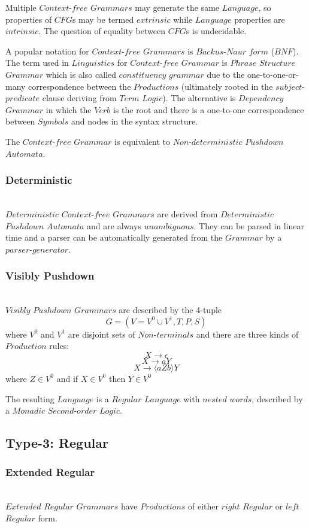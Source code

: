 \documentclass{article}
\begin{document}
Multiple $Context$-$free$ $Grammars$ may generate the same $Language$,
so properties of $CFG$s may be termed $extrinsic$ while $Language$
properties are $intrinsic$. The question of equality between $CFG$s is
undecidable.

A popular notation for $Context$-$free$ $Grammars$ is $Backus$-$Naur$
$form$ ($BNF$). The term used in $Linguistics$ for $Context$-$free$
$Grammar$ is $Phrase$ $Structure$ $Grammar$ which is also called
$constituency$ $grammar$ due to the one-to-one-or-many correspondence
between the $Productions$ (ultimately rooted in the
$subject$-$predicate$ clause deriving from $Term$ $Logic$). The
alternative is $Dependency$ $Grammar$ in which the $Verb$ is the root
and there is a one-to-one correspondence between $Symbols$ and nodes
in the syntax structure.

The $Context$-$free$ $Grammar$ is equivalent to $Non$-$deterministic$
$Pushdown$ $Automata$.

\subsubsection{Deterministic} \hfill \\
$Deterministic$ $Context$-$free$ $Grammars$ are derived from
$Deterministic$ $Pushdown$ $Automata$ and are always
$unambiguous$. They can be parsed in linear time and a parser can be
automatically generated from the $Grammar$ by a $parser$-$generator$.

\subsubsection{Visibly Pushdown} \hfill \\
$Visibly$ $Pushdown$ $Grammars$ are described by the 4-tuple
\[
    G = (V=V^0 \cup V^1,T,P,S)
\]
where $V^0$ and $V^1$ are disjoint sets of $Non$-$terminals$ and there
are three kinds of $Production$ rules:
\[
    X \rightarrow \epsilon
\]\[
    X \rightarrow aY
\]\[
    X \rightarrow \langle aZb \rangle Y
\]
where $Z \in V^0$ and if $X \in V^0$ then $Y \in V^0$

The resulting $Language$ is a $Regular$ $Language$ with $nested$
$words$, described by a $Monadic$ $Second$-$order$ $Logic$.

\subsection{Type-3: Regular}

\subsubsection{Extended Regular} \hfill \\
$Extended$ $Regular$ $Grammars$ have $Productions$ of either $right$
$Regular$ or $left$ $Regular$ form.
\end{document}
